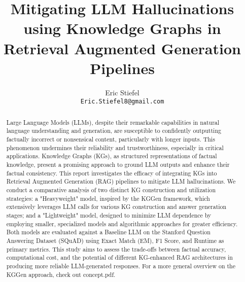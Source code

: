 \documentclass{article}
\begin{document}
\title{Mitigating LLM Hallucinations using Knowledge Graphs in Retrieval Augmented Generation Pipelines}

\author{Eric Stiefel \\
\texttt{Eric.Stiefel8@gmail.com} \\
}

\maketitle
\begin{abstract}
Large Language Models (LLMs), despite their remarkable capabilities in natural language understanding and generation, are susceptible to confidently outputting factually incorrect or nonsensical content, particularly with longer inputs. This phenomenon undermines their reliability and trustworthiness, especially in critical applications. Knowledge Graphs (KGs), as structured representations of factual knowledge, present a promising approach to ground LLM outputs and enhance their factual consistency. This report investigates the efficacy of integrating KGs into Retrieval Augmented Generation (RAG) pipelines to mitigate LLM hallucinations. We conduct a comparative analysis of two distinct KG construction and utilization strategies: a "Heavyweight" model, inspired by the KGGen framework, which extensively leverages LLM calls for various KG construction and answer generation stages; and a "Lightweight" model, designed to minimize LLM dependence by employing smaller, specialized models and algorithmic approaches for greater efficiency. Both models are evaluated against a Baseline LLM on the Stanford Question Answering Dataset (SQuAD) using Exact Match (EM), F1 Score, and Runtime as primary metrics. This study aims to assess the trade-offs between factual accuracy, computational cost, and the potential of different KG-enhanced RAG architectures in producing more reliable LLM-generated responses.
For a more general overview on the KGGen approach, check out concept.pdf.
\end{abstract}
\end{document}

